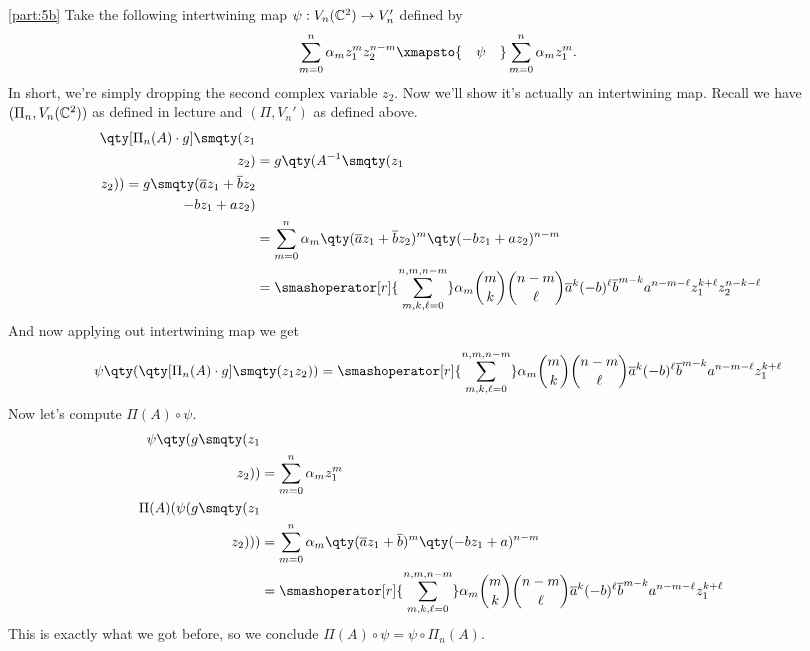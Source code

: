\documentclass[
	pages,
	boxes,
	color=WildStrawberry
]{homework}
\begin{document}
\begin{solution}
	\ref{part:5b}
	Take the following intertwining map $\psi:V_n(\mathbb{C}^2)\to V_n'$ defined by
	\begin{equation*}
		\sum_{m = 0}^{n} \alpha_m z_1^{m} z_2^{n - m}\xmapsto{\quad\psi\quad} \sum_{m = 0}^{n}\alpha_m z_1^{m}.
	\end{equation*}
	In short, we're simply dropping the second complex variable $z_2$. Now we'll show it's actually an intertwining map. Recall we have $(\Pi_n, V_n(\mathbb{C}^2))$ as defined in lecture and $(\Pi, V_n')$ as defined above.
	\begin{align*}
		\qty[\Pi_n(A)\cdot g]\smqty(z_1                                                                                                                                                        \\ z_2) & = g\qty(A^{-1}\smqty(z_1 \\ z_2)) = g\smqty(\conj{a}z_1 + \conj{b}z_2 \\ -bz_1 + az_2) \\
		 & = \sum_{m = 0}^{n}\alpha_m\qty(\conj{a}z_1 + \conj{b}z_2)^{m}\qty(-bz_1 + az_2)^{n - m}                                                                                             \\
		 & = \smashoperator[r]{\sum_{m, k, \ell = 0}^{n, m, n - m}}\alpha_m \binom{m}{k}\binom{n - m}{\ell}\conj{a}^k(-b)^\ell\conj{b}^{m - k}a^{n - m - \ell}z_1^{k + \ell}z_2^{n - k - \ell}
	\end{align*}
	And now applying out intertwining map we get
	\begin{equation*}
		\psi\qty(\qty[\Pi_n(A)\cdot g]\smqty(z_1 \\ z_2)) = \smashoperator[r]{\sum_{m, k, \ell = 0}^{n, m, n - m}}\alpha_m \binom{m}{k}\binom{n - m}{\ell}\conj{a}^k(-b)^\ell\conj{b}^{m - k}a^{n - m - \ell}z_1^{k + \ell}
	\end{equation*}
	Now let's compute $\Pi(A)\circ \psi$.
	\begin{align*}
		\psi\qty(g\smqty(z_1                                                                                                                                                 \\ z_2)) & = \sum_{m = 0}^n\alpha_m z_1^m \\
		\Pi(A)(\psi(g\smqty(z_1                                                                                                                                              \\ z_2))) & = \sum_{m = 0}^{n}\alpha_m\qty(\conj{a}z_1 + \conj{b})^{m}\qty(-bz_1 + a)^{n - m} \\
		 & = \smashoperator[r]{\sum_{m, k, \ell = 0}^{n, m, n - m}}\alpha_m \binom{m}{k}\binom{n - m}{\ell}\conj{a}^k(-b)^\ell\conj{b}^{m - k}a^{n - m - \ell}z_1^{k + \ell}
	\end{align*}
	This is exactly what we got before, so we conclude $\Pi(A)\circ\psi = \psi\circ \Pi_n(A)$.


\end{solution}
\end{document}
